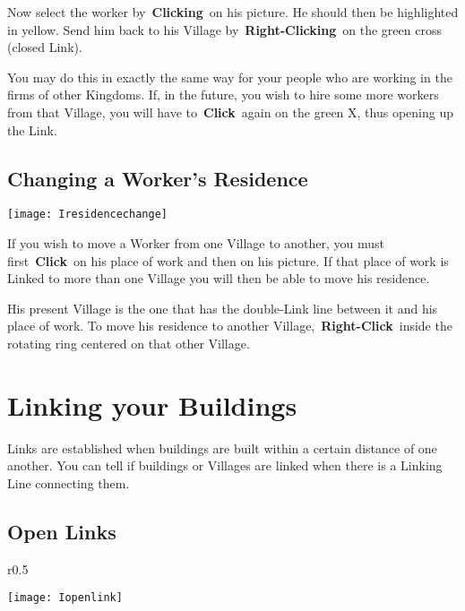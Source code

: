 Now select the worker by \textbf{Clicking} on his picture. He should then be highlighted in yellow. Send him back to his Village by \textbf{Right-Clicking} on the green cross (closed Link).

You may do this in exactly the same way for your people who are working in the firms of other Kingdoms. If, in the future, you wish to hire some more workers from that Village, you will have to \textbf{Click} again on the green X, thus opening up the Link.

\subsection{Changing a Worker’s Residence}


\begin{center}
	\texttt{[image: Iresidencechange]}
\end{center}

If you wish to move a Worker from one Village to another, you must first \textbf{Click} on his place of work and then on his picture. If that place of work is Linked to more than one Village you will then be able to move his residence.

His present Village is the one that has the double-Link line between it and his place of work. To move his residence to another Village, \textbf{Right-Click} inside the rotating ring centered on that other Village.

\section{Linking your Buildings}


Links are established when buildings are built within a certain distance of one another. You can tell if buildings or Villages are linked when there is a Linking Line connecting them.


\subsection{Open Links}


\begin{wrapfigure}{r}{0.5\textwidth}
	\vspace{-20pt}
	\begin{center}
		\texttt{[image: Iopenlink]}
	\end{center}
	\vspace{-20pt}
\end{wrapfigure}

